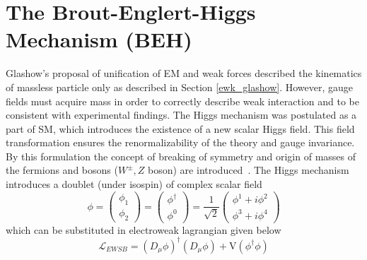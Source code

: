 \section{The Brout-Englert-Higgs Mechanism (BEH)}\label{chapter1_sec2}
Glashow's proposal of unification of EM and weak forces described the kinematics of massless particle only as described in Section \ref{ewk_glashow}. 
However, gauge fields must acquire mass in order to correctly describe weak interaction and to be consistent with experimental findings. 
The Higgs mechanism was postulated as a part of SM, which introduces the 
existence of a new scalar Higgs field. This field transformation ensures the renormalizability of the theory and gauge invariance. 
By this formulation
the concept of breaking of symmetry and origin of masses of the fermions and bosons ($W^{\pm}, Z$ boson) are introduced~\cite{Reference7,Reference8,Reference9,Reference10,Reference11,Reference12}. 
The Higgs mechanism introduces a doublet (under isospin) of complex scalar field 
\begin{equation}
\phi=\left(
  \begin{array}{c}
   \phi_{1}   \\
   \phi_{2} 
  \end{array}
\right)
=\left(
  \begin{array}{c}
   \phi^{\dag}   \\
   \phi^{0} 
  \end{array}
\right)
	=\frac{1}{\sqrt{2}}
\left(
  \begin{array}{c}
   \phi^{1}+i\phi^2   \\
   \phi^{3}+i\phi^4
  \end{array}
\right)
\label{eq:higgs_doublet_field}
\end{equation}
which can be substituted in electroweak lagrangian given below
\begin{equation}
 \mathscr{L}_{EWSB} = (D_{\mu}\phi)^{\dag}(D_{\mu}\phi)+\mathrm{V}(\phi^{\dag}\phi)
 \label{eq:EWSB_lagrangian}
\end{equation}
